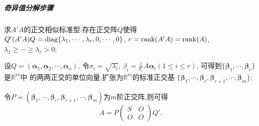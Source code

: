 \subparagraph{\color{ecolor}奇异值分解步骤}
\begin{asparaenum}[(1)]
  \item 求$A'A$的正交相似标准型:存在正交阵$Q$使得
  $Q'(A'A)Q=\operatorname{diag}\{\lambda_1,\cdots,\lambda_r,0,\cdots,0\}$, 
  $r=\operatorname{rank}(A'A)=\operatorname{rank}(A)$, $\lambda_1\geq\cdots\geq\lambda_r>0$;
  \item 设$Q=(\bm{\alpha}_1,\bm{\alpha}_2,\cdots,\bm{\alpha}_n)$,
  令$\sigma_i=\sqrt{\lambda_i}$, 
  $\beta_i=\frac{1}{\sigma_i}A\bm{\alpha}_i(1\leq i\leq r)$,
  可得到$\{\bm{\beta}_1,\cdots,\bm{\beta}_r\}$是$\mathbb{R}^m$中
  的两两正交的单位向量,扩张为$\mathbb{R}^m$的标准正交基
  $\{\bm{\beta}_1,\cdots,\bm{\beta}_r,\bm{\beta}_{r+1},\cdots,\bm{\beta}_m\}$;
  \item 令$P=(\bm{\beta}_1,\cdots,\bm{\beta}_r,\bm{\beta}_{r+1},
  \cdots,\bm{\beta}_m)$为$m$阶正交阵,则可得
  \[
    A=P\begin{pmatrix}
      S&O\\
      O&O
      \end{pmatrix}Q'.
  \]
\end{asparaenum}

